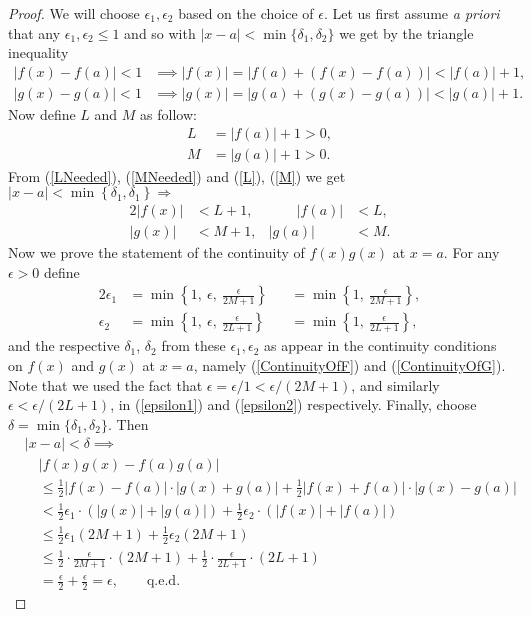 \begin{proof}
We will choose $\epsilon_1,\epsilon_2$ based on the choice of $\epsilon$.
Let us first assume {\it a priori} that any $\epsilon_1,\epsilon_2\le1$
and so with $|x-a|<\min\{\delta_1,\delta_2\}$ we get
by the triangle inequality
\begin{align}
|f(x)-f(a)|<1&\implies|f(x)|=|f(a)+(f(x)-f(a))|<|f(a)|+1,\label{LNeeded}\\
|g(x)-g(a)|<1&\implies|g(x)|=|g(a)+(g(x)-g(a))|<|g(a)|+1.\label{MNeeded}
\end{align}
Now define $L$ and $M$ as follow:
\begin{align}L&=|f(a)|+1>0,\label{L}\\ M&=|g(a)|+1>0.\label{M}\end{align}
From (\ref{LNeeded}), (\ref{MNeeded}) and (\ref{L}), (\ref{M}) we get
$|x-a|<\min\left\{\delta_1,\delta_1\right\}\Longrightarrow$
\begin{alignat}{2}
|f(x)|&<L+1,&\qquad |f(a)|&<L,\label{L+1,L}\\
|g(x)|&<M+1,&|g(a)|&<M.\label{M+1,M}\end{alignat}
Now we prove the statement of the continuity of $f(x)g(x)$ at $x=a$.
For any $\epsilon>0$ define
\begin{alignat}{2}
\epsilon_1&=\min\left\{1,\ \epsilon,\ \frac{\epsilon}{2M+1}\right\}
    &&=\min\left\{1,\ \frac{\epsilon}{2M+1}\right\}\label{epsilon1},\\
\epsilon_2&=\min\left\{1,\ \epsilon,\ \frac{\epsilon}{2L+1}\right\}
    &&=\min\left\{1,\ \frac{\epsilon}{2L+1}\right\},
    \label{epsilon2}\end{alignat}
and the respective $\delta_1$, $\delta_2$ from these
$\epsilon_1,\epsilon_2$ as appear in the continuity conditions
on $f(x)$ and $g(x)$ at $x=a$, namely (\ref{ContinuityOfF})
and (\ref{ContinuityOfG}). Note that we used the fact
that $\epsilon=\epsilon/1<\epsilon/(2M+1)$, and similarly
$\epsilon<\epsilon/(2L+1)$,
in (\ref{epsilon1}) and  (\ref{epsilon2}) respectively.
Finally, choose $\delta=\min\{\delta_1,\delta_2\}.$
Then
\begin{align*}
&|x-a|<\delta\implies\\
&\quad|f(x)g(x)-f(a)g(a)|\\
&\quad\le\frac12|f(x)-f(a)|\cdot|g(x)+g(a)|
+\frac12|f(x)+f(a)|\cdot|g(x)-g(a)|\\
&\quad
<\frac12\epsilon_1\cdot(|g(x)|+|g(a)|)+\frac12\epsilon_2\cdot(|f(x)|+|f(a)|)\\
&\quad\le
\frac12\epsilon_1(2M+1)+\frac12\epsilon_2(2M+1)\\
&\quad\le
\frac12\cdot\frac{\epsilon}{2M+1}\cdot(2M+1)+\frac12\cdot\frac{\epsilon}{2L+1}
\cdot(2L+1)\\
&\quad=\frac{\epsilon}2+\frac{\epsilon}2=\epsilon,\qquad\text{q.e.d.}
\end{align*}
\end{proof}
